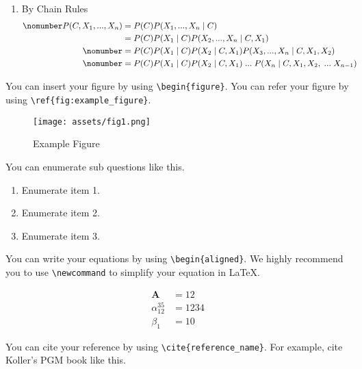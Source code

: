 \documentclass[12pt,a4paper]{article}
\newcommand{\Ab}{\bm{A}}
\begin{document}
\begin{enumerate}

\item By Chain Rules\\

\begin{align}
\nomumber P(C,X_1,...,X_n)&=P(C)P(X_1,...,X_n\mid C)&&\\
\nonumber &=P(C)P(X_1\mid C)P(X_2,...,X_n\mid C,X_1)&&\\
\nomumber &=P(C)P(X_1\mid C)P(X_2\mid C,X_1)P(X_3,...,X_n\mid C,X_1,X_2)&&\\
\nomumber &=P(C)P(X_1\mid C)P(X_2\mid C,X_1)\;...\;P(X_n\mid C,X_1,X_2,\;...\;X_{n-1})&&
\end{align}


\end{enumerate}


You can insert your figure by using \verb|\begin{figure}|.
You can refer your figure by using \verb|\ref{fig:example_figure}|.

\begin{figure}[!h]
    \begin{center}
        \texttt{[image: assets/fig1.png]}
        \caption{Example Figure}
        \label{fig:example_figure}
    \end{center}
\end{figure}

You can enumerate sub questions like this.

\begin{enumerate}
    \item Enumerate item 1.
    \item Enumerate item 2.
    \item Enumerate item 3.
\end{enumerate}

You can write your equations by using \verb|\begin{aligned}|.
We highly recommend you to use \verb|\newcommand| to simplify your equation in \LaTeX.

\begin{align}
    \Ab &= 12 \\
    \alpha_{12}^{35} &= 1234 \\
    \beta_1 &= 10
\end{align}

You can cite your reference by using \verb|\cite{reference_name}|.
For example, cite Koller's PGM book \cite{KollerPGM} like this.
\end{document}
